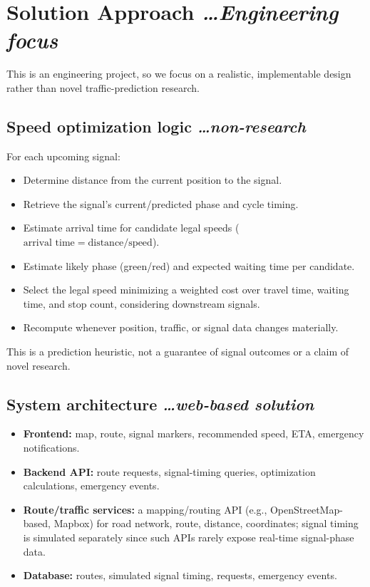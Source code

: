 \documentclass[11pt,a4paper]{article}
\newcommand{\BvrHint}[1]{%
  {\normalfont\normalsize\itshape\hfill #1}}
\begin{document}
\section{Solution Approach %
\BvrHint{\ldots Engineering focus}}
This is an engineering project, so we focus on a realistic, implementable design rather than novel traffic-prediction research.

\subsection{Speed optimization logic %
\BvrHint{\ldots non-research}}
For each upcoming signal:
\begin{itemize}[leftmargin=0.7cm]
    \item Determine distance from the current position to the signal.
    \item Retrieve the signal's current/predicted phase and cycle timing.
    \item Estimate arrival time for candidate legal speeds ($\text{arrival time} = \text{distance}/\text{speed}$).
    \item Estimate likely phase (green/red) and expected waiting time per candidate.
    \item Select the legal speed minimizing a weighted cost over travel time, waiting time, and stop count, considering downstream signals.
    \item Recompute whenever position, traffic, or signal data changes materially.
\end{itemize}
This is a prediction heuristic, not a guarantee of signal outcomes or a claim of novel research.

\subsection{System architecture %
\BvrHint{\ldots web-based solution}}
\begin{itemize}[leftmargin=0.7cm]
    \item \textbf{Frontend:} map, route, signal markers, recommended speed, ETA, emergency notifications.
    \item \textbf{Backend API:} route requests, signal-timing queries, optimization calculations, emergency events.
    \item \textbf{Route/traffic services:} a mapping/routing API (e.g., OpenStreetMap-based, Mapbox) for road network, route, distance, coordinates; signal timing is simulated separately since such APIs rarely expose real-time signal-phase data.
    \item \textbf{Database:} routes, simulated signal timing, requests, emergency events.
\end{itemize}
\end{document}
